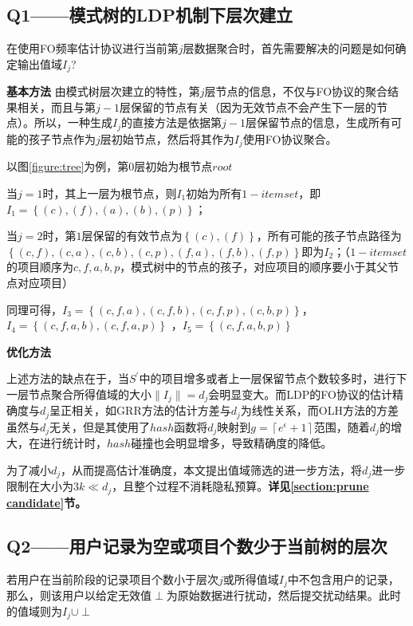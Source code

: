 \documentclass[UTF8,a4paper]{ctexart}
\begin{document}
  \subsection{Q1——模式树的LDP机制下层次建立}
  \label{section:Q1}
  在使用FO频率估计协议进行当前第$j$层数据聚合时，首先需要解决的问题是如何确定输出值域$I_{j}$?


  \textbf{基本方法}
  由模式树层次建立的特性，第$j$层节点的信息，不仅与FO协议的聚合结果相关，而且与第$j-1$层保留的节点有关（因为无效节点不会产生下一层的节点）。所以，一种生成$I_j$的直接方法是依据第$j-1$层保留节点的信息，生成所有可能的孩子节点作为$j$层初始节点，然后将其作为$I_j$使用FO协议聚合。

  以图\ref{figure:tree}为例，第$0$层初始为根节点$root$

  当$j = 1$时，其上一层为根节点，则$I_1$初始为所有$1-itemset$，即$I_1 = \left\{ (c), (f), (a), (b) , (p)\right\}$；

  当$j = 2$时，第$1$层保留的有效节点为$\left\{(c),(f) \right\}$，所有可能的孩子节点路径为$\left\{(c,f),(c,a),(c,b),(c,p),(f,a),(f,b),(f,p)\right\}$即为$I_2$；（$1-itemset$的项目顺序为$c,f,a,b,p$，模式树中的节点的孩子，对应项目的顺序要小于其父节点对应项目）

  同理可得，$I_3 =\left\{(c,f,a),(c,f,b),(c,f,p),(c,b,p) \right\}$，$I_4 = \left\{ (c,f,a,b),(c,f,a,p)\right\}$ ，$I_5 = \left\{ (c,f,a,b,p)\right\}$ 
  
  \textbf{优化方法}

  上述方法的缺点在于，当$S^{\prime}$中的项目增多或者上一层保留节点个数较多时，进行下一层节点聚合所得值域的大小$\| I_j\| = d_j$会明显变大。而LDP的FO协议的估计精确度与$d_j$呈正相关，如GRR方法的估计方差与$d_j$为线性关系，而OLH方法的方差虽然与$d_j$无关，但是其使用了$hash$函数将$d_j$映射到$g = \left \lceil e^{\epsilon}+1 \right \rceil$范围，随着$d_j$的增大，在进行统计时，$hash$碰撞也会明显增多，导致精确度的降低。
  
  为了减小$d_j$，从而提高估计准确度，本文提出值域筛选的进一步方法，将$d_j$进一步限制在大小为$3k \ll d_j$，且整个过程不消耗隐私预算。\textbf{详见\ref{section:prune candidate}节。}

  \subsection{Q2——用户记录为空或项目个数少于当前树的层次}
  \label{section:Q2}
  若用户在当前阶段的记录项目个数小于层次$j$或所得值域$I_j$中不包含用户的记录，那么，则该用户以给定无效值$\perp$为原始数据进行扰动，然后提交扰动结果。此时的值域则为$I_j \cup \perp$
\end{document}

